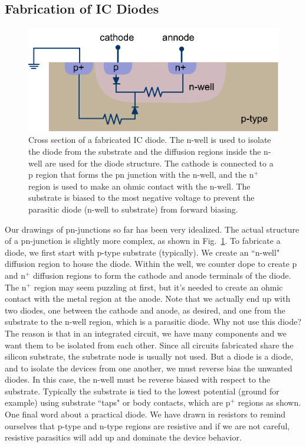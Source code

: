 \subsection{Fabrication of IC Diodes}
\begin{figure}[tb]
\centering
\includegraphics[width=.65\columnwidth]{slide44}
\caption{Cross section of a fabricated IC diode.  The n-well is used to isolate the diode from the substrate and the diffusion regions inside the n-well are used for the diode structure.  The cathode is connected to a p region that forms the pn junction with the n-well, and the n$^+$ region is used to make an ohmic contact with the n-well.  The substrate is biased to the most negative voltage to prevent the parasitic diode (n-well to substrate) from forward biasing.}
\label{fig:slide44}
\end{figure}
Our drawings of pn-junctions so far has been very idealized.  The actual structure of a pn-junction is slightly more complex, as shown in Fig.~\ref{fig:slide44}.  To fabricate a diode, we first start with p-type substrate (typically).  We create an ``n-well" diffusion region  to house the diode.  Within the well, we counter dope to create p and n$^+$ diffusion regions to form  the cathode and anode terminals of the diode.  The n$^+$ region may seem puzzling at first, but it's needed to create an ohmic contact with the metal region at the anode.  Note that we actually end up with two diodes, one between the cathode and anode, as desired, and one from the substrate to the n-well region, which is a parasitic diode.  Why not use this diode?  The reason is that in an integrated circuit, we have many components and we want them to be isolated from each other.  Since all circuits fabricated share the silicon substrate, the substrate node is usually not used.  But a diode is a diode, and to isolate the devices from one another, we must reverse bias the unwanted diodes.  In this case, the n-well must be reverse biased with respect to the substrate.  Typically the substrate is tied to the lowest potential (ground for example) using substrate ``taps" or body contacts, which are p$^+$ regions as shown.  One final word about a practical diode.  We have drawn in resistors to remind ourselves that p-type and n-type regions are resistive and if we are not careful, resistive parasitics will add up and dominate the device behavior.  
